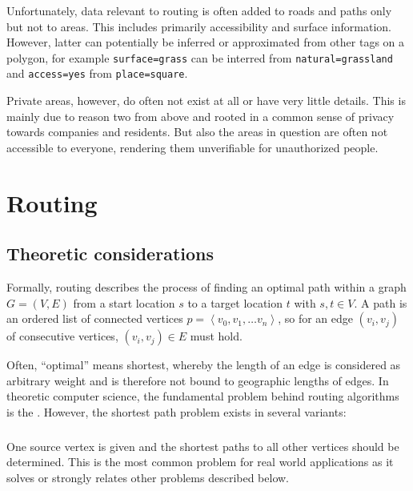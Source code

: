 			Unfortunately, data relevant to routing is often added to roads and paths only but not to areas.
			This includes primarily accessibility and surface information.
			However, latter can potentially be inferred or approximated from other tags on a polygon, for example \texttt{surface=grass} can be interred from \texttt{natural=grassland} and \texttt{access=yes} from \texttt{place=square}.
			
			Private areas, however, do often not exist at all or have very little details.
			This is mainly due to reason two from above and rooted in a common sense of privacy towards companies and residents.
			But also the areas in question are often not accessible to everyone, rendering them unverifiable for unauthorized people.

\section{Routing}

	
	\subsection{Theoretic considerations}
	
		Formally, routing describes the process of finding an optimal path within a graph $G=(V, E)$ from a start location $s$ to a target location $t$ with $s, t \in V$.
		A path is an ordered list of connected vertices $p=\left\langle v_0, v_1, \dots v_n \right\rangle$, so for an edge $(v_i, v_j)$ of consecutive vertices, $(v_i, v_j) \in E$ must hold.
		
		Often, \enquote{optimal} means shortest, whereby the length of an edge is considered as arbitrary weight and is therefore not bound to geographic lengths of edges.
		In theoretic computer science, the fundamental problem behind routing algorithms is the .
		However, the shortest path problem exists in several variants\cite[644]{cormen-introduction-to-alg}:
		
		\subsubsection{}
		
			One source vertex is given and the shortest paths to all other vertices should be determined.
			This is the most common problem for real world applications as it solves or strongly relates other problems described below.
			
